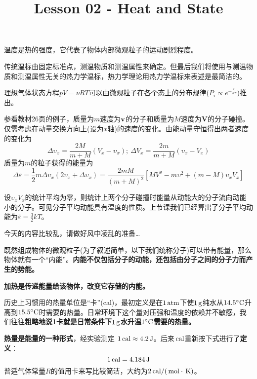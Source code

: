 \documentclass[CJK]{beamer}
\title{Lesson 02 - Heat and State}
\author{}
\date{}
\begin{document}

\begin{frame}
\bch
\bitem
\item{温度是热的强度，它代表了物体内部微观粒子的运动剧烈程度。}
\item{传统温标由固定标准点，测温物质和测温属性来确定。但最后我们将使用与测温物质和测温属性无关的热力学温标，热力学理论用热力学温标来表述是最简洁的。}
\item{理想气体状态方程$pV = \nu RT$可以由微观粒子在各个态上的分布规律($P_i\propto e^{-\frac{\varepsilon_i}{kT}}$)推出。}
\eitem

\ech
\end{frame}


\begin{frame}
\bch
{\small
参看教材26页的例子，质量为$m$速度为${\mathbf{v}}$的分子和质量为$M$速度为$\mathbf{V}$的分子碰撞。仅需考虑在动量交换方向上(设为$x$轴)的速度的变化。由能动量守恒得出两者速度的变化为
$$\Delta \upsilon_x = \frac{2M}{m+M}\left(V_x-\upsilon_x\right);\ \Delta V_x= \frac{2m}{m+M}\left(\upsilon_x-V_x\right)$$
质量为$m$的粒子获得的能量为
$$\Delta\varepsilon = \frac{1}{2}m\Delta\upsilon_x (2\upsilon_x + \Delta\upsilon_x) = \frac{2mM}{(m+M)^2}\left[MV^2-m\upsilon^2 +(m-M)\upsilon_x V_x\right]$$


\skipline

设$\upsilon_x V_x$的统计平均为零，则统计上两个分子碰撞时能量从动能大的分子流向动能小的分子。可见分子平均动能具有温度的性质。上节课我们已经算出了分子平均动能为$\bar{\varepsilon} = \frac{3}{2}kT$。
}
\ech
\end{frame}


\begin{frame}
\bch
今天的内容比较乱，请做好风中凌乱的准备…
\ech
\end{frame}

\begin{frame}
\bch
\bitem
\item{既然组成物体的微观粒子(为了叙述简单，以下我们统称分子)可以带有能量，那么物体就有一个“内能”。{\bf 内能不仅包括分子的动能，还包括由分子之间的分子力而产生的势能。}}
\item{\bf 加热是传递能量给该物体，改变它存储的内能。}
\item{历史上习惯用的热量单位是“卡”(cal)，最初定义是在$1\,\mathrm{atm}$下使$1\,\mathrm{g}$纯水从$14.5^\circ \mathrm{C}$升高到$15.5^\circ \mathrm{C}$时需要的热量。日常环境下这个量对压强和温度的依赖并不敏感，我们往往{\bf 粗略地说1卡就是日常条件下$1\,\mathrm{g}$水升温$1^\circ \mathrm{C}$需要的热量。}}
\item{{\bf 热量是能量的一种形式}，经实验测定 $1\,\mathrm{cal} \approx 4.2\,\mathrm{J}$。后来$\,\mathrm{cal}$重新按下式进行了{\bf 定义}：
$$1\,\mathrm{cal} = 4.184 \,\mathrm{J}$$
普适气体常量$R$的值用卡来写比较简洁，大约为$2\,\mathrm{cal}/(\,\mathrm{mol}\cdot\,\mathrm{K})$。}
\eitem

\ech
\end{frame}
\end{document}
